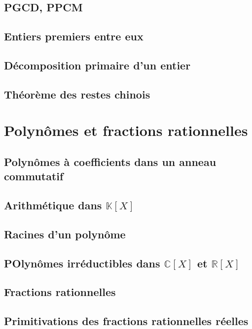 \documentclass[11pt,twoside,a4paper]{article}
\begin{document}
\subsection{PGCD, PPCM}

\subsection{Entiers premiers entre eux}

\subsection{Décomposition primaire d'un entier}

\subsection{Théorème des restes chinois}

\newpage
\section{Polynômes et fractions rationnelles}

\subsection{Polynômes à coefficients dans un anneau commutatif}

\subsection{Arithmétique dans $\mathbb{K}[X]$}

\subsection{Racines d'un polynôme}

\subsection{POlynômes irréductibles dans $\mathbb{C}[X]$ et $\mathbb{R}[X]$}

\subsection{Fractions rationnelles}

\subsection{Primitivations des fractions rationnelles réelles}
\end{document}
